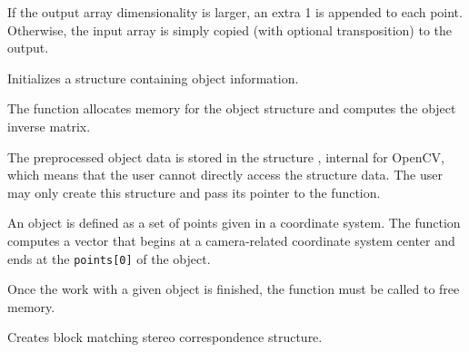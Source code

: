 If the output array dimensionality is larger, an extra 1 is appended to each point.  Otherwise, the input array is simply copied (with optional transposition) to the output.


\ifCPy

Initializes a structure containing object information.


\begin{description}
\ifC
{}
\else
{}
\fi
\end{description}

The function allocates memory for the object structure and computes the object inverse matrix.

The preprocessed object data is stored in the structure , internal for OpenCV, which means that the user cannot directly access the structure data. The user may only create this structure and pass its pointer to the function.

An object is defined as a set of points given in a coordinate system. The function  computes a vector that begins at a camera-related coordinate system center and ends at the \texttt{points[0]} of the object.

Once the work with a given object is finished, the function  must be called to free memory.

Creates block matching stereo correspondence structure.


